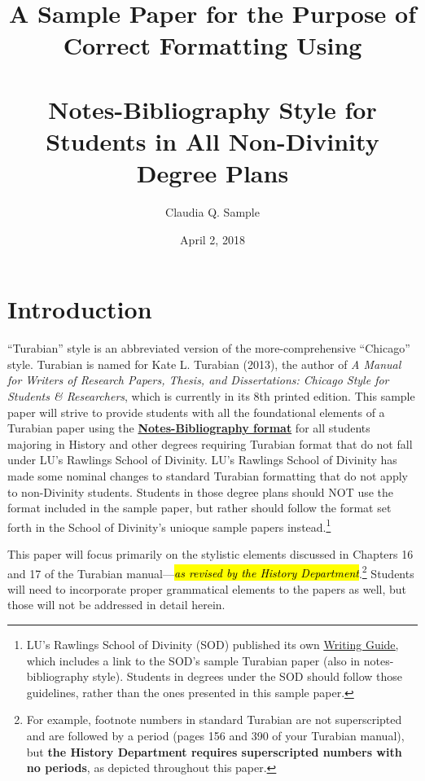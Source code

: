 \documentclass[raggedright]{turabian-researchpaper}
\title{\normalfont A Sample Paper for the Purpose of Correct Formatting Using
  \\\ \\ \textbf{Notes-Bibliography} Style for Students in All
  \textbf{Non-Divinity} Degree Plans}
\author{Claudia Q. Sample}
\date{April 2, 2018}
\newcommand*{\bluehref}[2]{\href{#1}{\color{blue}\ul{#2}}}
\begin{document}
\maketitle

\setcounter{page}{2}
\setcounter{tocdepth}{2}
\tableofcontents
\clearpage
{}

\section{Introduction}

``Turabian'' style is an abbreviated version of the more-comprehensive
``Chicago'' style. Turabian is named for Kate L. Turabian (2013), the author of
\textit{A Manual for Writers of Research Papers, Thesis, and Dissertations:
Chicago Style for Students \& Researchers}, which is currently in its 8th
printed edition.\autocite{Turabian} This sample paper will strive to provide
students with all the foundational elements of a Turabian paper using the
\textbf{\ul{Notes-Bibliography format}} for all students majoring in History and
other degrees requiring Turabian format that do not fall under LU's Rawlings
School of Divinity. LU's Rawlings School of Divinity has made some nominal
changes to standard Turabian formatting that do not apply to non-Divinity
students. Students in those degree plans should NOT use the format included in
the sample paper, but rather should follow the format set forth in the School of
Divinity's unioque sample papers instead.\footnote{LU's Rawlings School of
Divinity (SOD) published its own
\bluehref{http://www.liberty.edu/divinity/index.cfm?PID=28160}{Writing Guide},
which includes a link to the SOD's sample Turabian paper (also in
notes-bibliography style). Students in degrees under the SOD should follow those
guidelines, rather than the ones presented in this sample paper.}

This paper will focus primarily on the stylistic elements discussed in Chapters
16 and 17 of the Turabian manual\autocite[144-215]{Turabian}---\hl{\emph{as revised
by the History Department}}.\footnote{For example, footnote numbers in standard
Turabian are not superscripted and are followed by a period (pages 156 and 390
of your Turabian manual), but \textbf{the History Department requires
superscripted numbers with no periods}, as depicted throughout this paper.}
Students will need to incorporate proper grammatical elements to the papers as
well, but those will not be addressed in detail herein.
\end{document}

